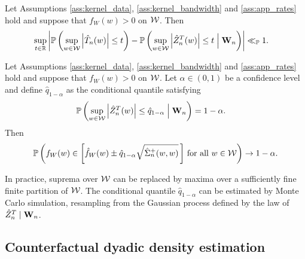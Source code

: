 \begin{lemma}
  \label{lem:feasible_gaussian_approx}

  Let Assumptions \ref{ass:kernel_data}, \ref{ass:kernel_bandwidth}
  and \ref{ass:app_rates} hold and suppose that $f_W(w) > 0$ on $\mathcal{W}$.
  Then
  \begin{align*}
    \sup_{t \in \mathbb{R}}
    \left|
    \mathbb{P}\left(
      \sup_{w \in \mathcal{W}}
      \left| \hat T_n(w) \right|
      \leq t
    \right)
    - \mathbb{P}\left(
      \sup_{w \in \mathcal{W}}
      \left| \hat Z_n^T(w) \right|
      \leq t
      \Bigm\vert \mathbf{W}_n
    \right)
    \right|
    &\ll_{\mathbb{P}}
    1.
  \end{align*}

\end{lemma}

\begin{theorem}
  \label{thm:kernel_app_ucb}

  Let Assumptions \ref{ass:kernel_data}, \ref{ass:kernel_bandwidth}
  and \ref{ass:app_rates} hold and suppose that $f_W(w) > 0$ on $\mathcal{W}$.
  Let $\alpha \in (0,1)$ be a confidence level
  and define $\hat q_{1-\alpha}$ as the
  conditional quantile satisfying
  \begin{align*}
    \mathbb{P}\left(
      \sup_{w \in \mathcal{W}}
      \left| \hat Z_n^T(w) \right|
      \leq \hat q_{1-\alpha}
      \Bigm\vert \mathbf{W}_n
    \right)
    &=
    1 - \alpha.
  \end{align*}
  Then
  \begin{align*}
    \mathbb{P}\left(
      f_W(w)
      \in
      \left[
        \hat f_W(w)
        \pm
        \hat q_{1-\alpha}
        \sqrt{\hat\Sigma_n^+(w,w)}
        \,\right]
      \,\textup{for all }
      w \in \mathcal{W}
    \right)
    \to 1 - \alpha.
  \end{align*}

\end{theorem}

\begin{remark}

  In practice, suprema over $\mathcal{W}$ can be
  replaced by maxima over a sufficiently fine finite partition of $\mathcal{W}$.
  The conditional quantile $\hat q_{1-\alpha}$
  can be estimated by Monte Carlo
  simulation,
  resampling from the Gaussian process defined by the law of
  $\hat Z_n^T \mid \mathbf{W}_n$.
\end{remark}

\subsection{Counterfactual
  dyadic density estimation}
\label{subsec:counterfactual}

